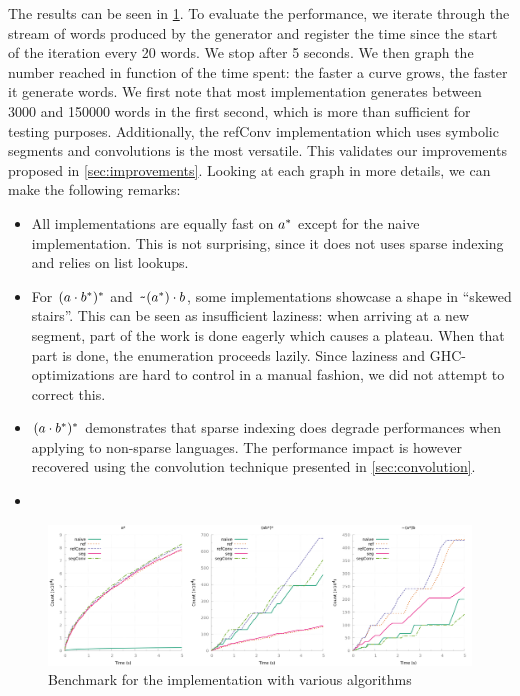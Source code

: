 The results can be seen in \cref{bench:haskell:all}.
To evaluate the performance, we iterate through the stream of words produced by
the generator and register the time since the start of the iteration
every 20 words. We stop after 5 seconds. We then graph the number reached in
function of the time spent: the faster a curve grows, the faster it generate
words.
We first note that most implementation generates between 3000 and
150000 words in the first second, which is more than sufficient for testing
purposes.
Additionally, the refConv implementation
which uses symbolic segments and convolutions
is the most versatile. This validates our improvements
proposed in \cref{sec:improvements}.
Looking at each graph in more details, we can make the following remarks:
\begin{itemize}[leftmargin=*]
\item All implementations are equally fast on $a^*$ except
for the naive implementation. This is not surprising, since it does not uses
sparse indexing and relies on list lookups.
\item 
For $(a \cdot{b^*})^*$ and
$\texttt{\textasciitilde}{(a^*)} \cdot{b}$, some implementations showcase
a shape in ``skewed stairs''. This can be seen as insufficient laziness:
when arriving at a new segment, part of the work is done eagerly which causes
a plateau. When that part is done, the enumeration proceeds lazily.
Since laziness and GHC-optimizations are hard to control in a manual fashion,
we did not attempt to correct this.
\item $(a \cdot{b^*})^*$ demonstrates that sparse indexing
  does degrade performances when applying  to non-sparse languages.
  The performance impact is however recovered using the convolution technique
  presented in \cref{sec:convolution}.
\item {}
\end{itemize}

\begin{figure}[h]
  \centering
  \includegraphics[width=\linewidth]{measure/haskell_all.png}
  \caption{Benchmark for the \haskell implementation with various algorithms}
  \label{bench:haskell:all}
\end{figure}

